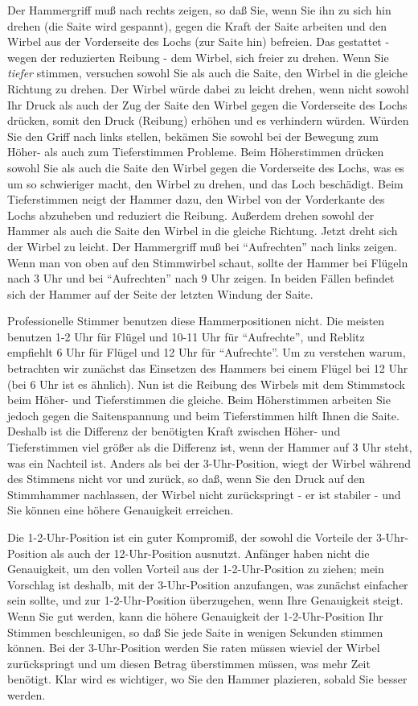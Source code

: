 Der Hammergriff muß nach rechts zeigen, so daß Sie, wenn Sie ihn zu sich hin drehen (die Saite wird gespannt), gegen die Kraft der Saite arbeiten und den Wirbel aus der Vorderseite des Lochs (zur Saite hin) befreien.
Das gestattet - wegen der reduzierten Reibung - dem Wirbel, sich freier zu drehen.
Wenn Sie \textit{tiefer} stimmen, versuchen sowohl Sie als auch die Saite, den Wirbel in die gleiche Richtung zu drehen.
Der Wirbel würde dabei zu leicht drehen, wenn nicht sowohl Ihr Druck als auch der Zug der Saite den Wirbel gegen die Vorderseite des Lochs drücken, somit den Druck (Reibung) erhöhen und es verhindern würden.
Würden Sie den Griff nach links stellen, bekämen Sie sowohl bei der Bewegung zum Höher- als auch zum Tieferstimmen Probleme.
Beim Höherstimmen drücken sowohl Sie als auch die Saite den Wirbel gegen die Vorderseite des Lochs, was es um so schwieriger macht, den Wirbel zu drehen, und das Loch beschädigt.
Beim Tieferstimmen neigt der Hammer dazu, den Wirbel von der Vorderkante des Lochs abzuheben und reduziert die Reibung.
Außerdem drehen sowohl der Hammer als auch die Saite den Wirbel in die gleiche Richtung.
Jetzt dreht sich der Wirbel zu leicht.
Der Hammergriff muß bei \enquote{Aufrechten} nach links zeigen.
Wenn man von oben auf den Stimmwirbel schaut, sollte der Hammer bei Flügeln nach 3 Uhr und bei \enquote{Aufrechten} nach 9 Uhr zeigen.
In beiden Fällen befindet sich der Hammer auf der Seite der letzten Windung der Saite.

Professionelle Stimmer benutzen diese Hammerpositionen nicht.
Die meisten benutzen 1-2 Uhr für Flügel und 10-11 Uhr für \enquote{Aufrechte}, und Reblitz empfiehlt 6 Uhr für Flügel und 12 Uhr für \enquote{Aufrechte}.
Um zu verstehen warum, betrachten wir zunächst das Einsetzen des Hammers bei einem Flügel bei 12 Uhr (bei 6 Uhr ist es ähnlich).
Nun ist die Reibung des Wirbels mit dem Stimmstock beim Höher- und Tieferstimmen die gleiche.
Beim Höherstimmen arbeiten Sie jedoch gegen die Saitenspannung und beim Tieferstimmen hilft Ihnen die Saite.
Deshalb ist die Differenz der benötigten Kraft zwischen Höher- und Tieferstimmen viel größer als die Differenz ist, wenn der Hammer auf 3 Uhr steht, was ein Nachteil ist.
Anders als bei der 3-Uhr-Position, wiegt der Wirbel während des Stimmens nicht vor und zurück, so daß, wenn Sie den Druck auf den Stimmhammer nachlassen, der Wirbel nicht zurückspringt - er ist stabiler - und Sie können eine höhere Genauigkeit erreichen.

Die 1-2-Uhr-Position ist ein guter Kompromiß, der sowohl die Vorteile der 3-Uhr-Position als auch der 12-Uhr-Position ausnutzt.
Anfänger haben nicht die Genauigkeit, um den vollen Vorteil aus der 1-2-Uhr-Position zu ziehen; mein Vorschlag ist deshalb, mit der 3-Uhr-Position anzufangen, was zunächst einfacher sein sollte, und zur 1-2-Uhr-Position überzugehen, wenn Ihre Genauigkeit steigt.
Wenn Sie gut werden, kann die höhere Genauigkeit der 1-2-Uhr-Position Ihr Stimmen beschleunigen, so daß Sie jede Saite in wenigen Sekunden stimmen können.
Bei der 3-Uhr-Position werden Sie raten müssen wieviel der Wirbel zurückspringt und um diesen Betrag überstimmen müssen, was mehr Zeit benötigt.
Klar wird es wichtiger, wo Sie den Hammer plazieren, sobald Sie besser werden.
 

